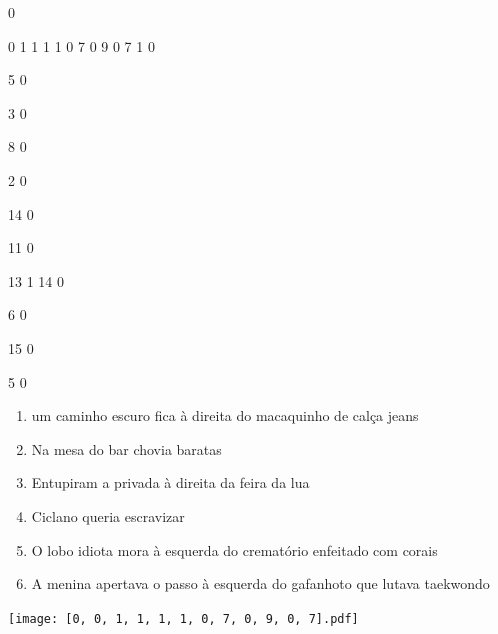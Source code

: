 \documentclass[12pt]{article}
\begin{document}
		\vfill  
		  
{
	0	%

	0	%
	1	%
	1	%
	1	%
	1	%
	0	%
	7	%
	0	%
	9	%
	0	%
	7	%
	1	%
	0	%

	5	%
	0	%

	3	%
	0	%

	8	%
	0	%

	2	%
	0	%

	14	%
	0	%

	11	%
	0	%

	13	%
	1	%
	14	%
	0	%

	6	%
	0	%

	15	%
	0	%

	5	%
	0	%

}	  
		    	

		 

\pagebreak


	\begin{enumerate}
		  \sffamily %
		  \large %


\vfill \item
um caminho escuro fica	%
à direita
do macaquinho de calça jeans	%

\vfill \item
Na mesa do bar	%
chovia baratas	%

\vfill \item
Entupiram a privada	%
à direita
da feira da lua	%

\vfill \item
Ciclano	%
queria escravizar	%

\vfill \item
O lobo idiota mora	%
à esquerda
do crematório enfeitado com corais	%

\vfill \item
A menina apertava o passo	%
à esquerda
do gafanhoto que lutava taekwondo	%
	\end{enumerate}
		  
		  \hfill

		  \vfill

\texttt{[image: [0, 0, 1, 1, 1, 1, 0, 7, 0, 9, 0, 7].pdf]}


	\hfill	  	  
\end{document}
